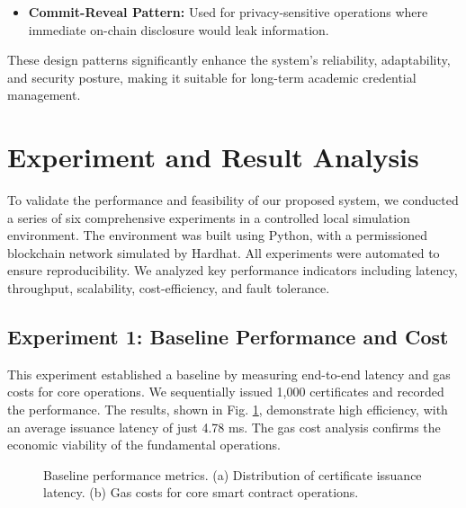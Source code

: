 \documentclass[lettersize,journal]{IEEEtran}
\begin{document}
\begin{itemize}
\begin{itemize}
    \item \textbf{Commit-Reveal Pattern:} Used for privacy-sensitive operations where immediate on-chain disclosure would leak information.
\end{itemize}

These design patterns significantly enhance the system's reliability, adaptability, and security posture, making it suitable for long-term academic credential management.

\section{Experiment and Result Analysis}

To validate the performance and feasibility of our proposed system, we conducted a series of six comprehensive experiments in a controlled local simulation environment. The environment was built using Python, with a permissioned blockchain network simulated by Hardhat. All experiments were automated to ensure reproducibility. We analyzed key performance indicators including latency, throughput, scalability, cost-efficiency, and fault tolerance.

\subsection{Experiment 1: Baseline Performance and Cost}
This experiment established a baseline by measuring end-to-end latency and gas costs for core operations. We sequentially issued 1,000 certificates and recorded the performance. The results, shown in Fig. \ref{fig:exp1}, demonstrate high efficiency, with an average issuance latency of just 4.78 ms. The gas cost analysis confirms the economic viability of the fundamental operations.

\begin{figure}[!t]
\centering
{}
\hfil
{}
\caption{Baseline performance metrics. (a) Distribution of certificate issuance latency. (b) Gas costs for core smart contract operations.}
\label{fig:exp1}
\end{figure}


\end{itemize}
\end{document}
